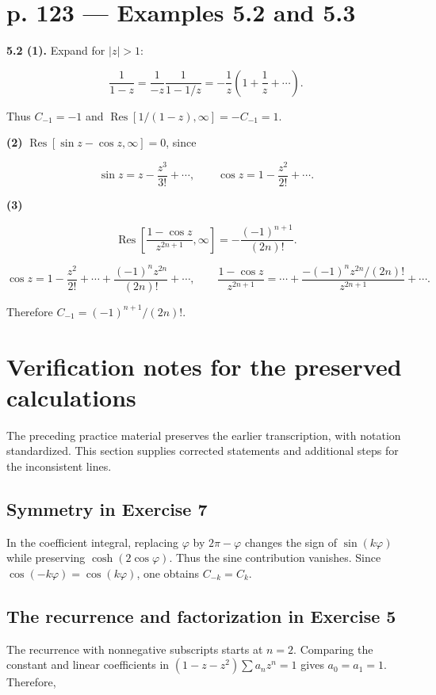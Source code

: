 \documentclass[11pt,a4paper]{article}
\theoremstyle{definition}
\theoremstyle{plain}
\begin{document}
\section{p. 123 --- Examples 5.2 and 5.3}

\textbf{5.2 (1).} Expand for $|z|>1$:

\[
\frac1{1-z}=\frac1{-z}\frac1{1-1/z}
=-\frac1z\left(1+\frac1z+\cdots\right).
\]

Thus $C_{-1}=-1$ and $\operatorname{Res}[1/(1-z),\infty]=-C_{-1}=1$.

\textbf{(2)} $\operatorname{Res}[\sin z-\cos z,\infty]=0$, since

\[
\sin z=z-\frac{z^3}{3!}+\cdots,\qquad
\cos z=1-\frac{z^2}{2!}+\cdots.
\]

\textbf{(3)}

\[
\operatorname{Res}\left[\frac{1-\cos z}{z^{2n+1}},\infty\right]
=-\frac{(-1)^{n+1}}{(2n)!}.
\]

\[
\cos z=1-\frac{z^2}{2!}+\cdots+\frac{(-1)^nz^{2n}}{(2n)!}+\cdots,
\qquad
\frac{1-\cos z}{z^{2n+1}}
=\cdots+\frac{-(-1)^nz^{2n}/(2n)!}{z^{2n+1}}+\cdots.
\]

Therefore $C_{-1}=(-1)^{n+1}/(2n)!$.


\section{Verification notes for the preserved calculations}

The preceding practice material preserves the earlier transcription, with notation standardized. This section supplies corrected statements and additional steps for the inconsistent lines.

\subsection{Symmetry in Exercise 7}

In the coefficient integral, replacing $\varphi$ by $2\pi-\varphi$ changes the sign of $\sin(k\varphi)$ while preserving $\cosh(2\cos\varphi)$. Thus the sine contribution vanishes. Since $\cos(-k\varphi)=\cos(k\varphi)$, one obtains $C_{-k}=C_k$.

\subsection{The recurrence and factorization in Exercise 5}

The recurrence with nonnegative subscripts starts at $n=2$. Comparing the constant and linear coefficients in $(1-z-z^2)\sum a_nz^n=1$ gives $a_0=a_1=1$. Therefore,
\end{document}
